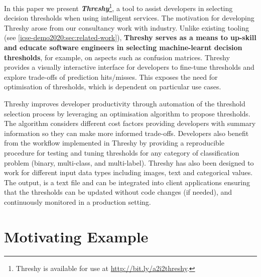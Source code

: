 In this paper we present \textit{\bfseries Threshy}\footnote{Threshy is available for use at \url{http://bit.ly/a2i2threshy}.}, a tool to assist developers in selecting decision thresholds when using intelligent services. The motivation for developing Threshy arose from our consultancy work with industry. Unlike existing tooling (see \cref{icse-demo2020:sec:related-work}), \textbf{Threshy serves as a means to up-skill and educate software engineers in selecting machine-learnt decision thresholds}, for example, on aspects such as confusion matrices. Threshy provides a visually interactive interface for developers to fine-tune thresholds and explore trade-offs of prediction hits/misses. This exposes the need for optimisation of thresholds, which is dependent on particular use cases.

Threshy improves developer productivity through automation of the threshold selection process by leveraging an optimisation algorithm to propose thresholds. The algorithm considers different cost factors providing developers with summary information so they can make more informed trade-offs. Developers also benefit from the workflow implemented in Threshy by providing a reproducible procedure for testing and tuning thresholds for any category of classification problem (binary, multi-class, and multi-label). Threshy has also been designed to work for different input data types including images, text and categorical values. The output, is a text file and can be integrated into client applications ensuring that the thresholds can be updated without code changes (if needed), and continuously monitored in a production setting. 



\section{Motivating Example}
\label{icse-demo2020:sec:motivating-example}

